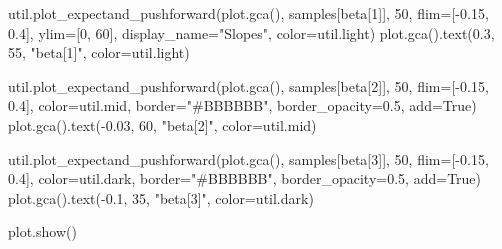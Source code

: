 \documentclass[
  letterpaper,
  DIV=11,
  numbers=noendperiod]{scrartcl}
\newenvironment{Shaded}{\begin{snugshade}}{\end{snugshade}}
\newcommand{\DecValTok}[1]{\textcolor[rgb]{0.68,0.00,0.00}{#1}}
\newcommand{\FloatTok}[1]{\textcolor[rgb]{0.68,0.00,0.00}{#1}}
\newcommand{\NormalTok}[1]{\textcolor[rgb]{0.00,0.23,0.31}{#1}}
\newcommand{\OperatorTok}[1]{\textcolor[rgb]{0.37,0.37,0.37}{#1}}
\newcommand{\StringTok}[1]{\textcolor[rgb]{0.13,0.47,0.30}{#1}}
\newcommand{\VariableTok}[1]{\textcolor[rgb]{0.07,0.07,0.07}{#1}}
\begin{document}
\begin{Shaded}
\begin{Highlighting}[]
\NormalTok{util.plot\_expectand\_pushforward(plot.gca(), samples[}\StringTok{\textquotesingle{}beta[1]\textquotesingle{}}\NormalTok{],}
                                \DecValTok{50}\NormalTok{, flim}\OperatorTok{=}\NormalTok{[}\OperatorTok{{-}}\FloatTok{0.15}\NormalTok{, }\FloatTok{0.4}\NormalTok{],}
\NormalTok{                                ylim}\OperatorTok{=}\NormalTok{[}\DecValTok{0}\NormalTok{, }\DecValTok{60}\NormalTok{],}
\NormalTok{                                display\_name}\OperatorTok{=}\StringTok{"Slopes"}\NormalTok{,}
\NormalTok{                                color}\OperatorTok{=}\NormalTok{util.light)}
\NormalTok{plot.gca().text(}\FloatTok{0.3}\NormalTok{, }\DecValTok{55}\NormalTok{, }\StringTok{"beta[1]"}\NormalTok{, color}\OperatorTok{=}\NormalTok{util.light)}

\NormalTok{util.plot\_expectand\_pushforward(plot.gca(), samples[}\StringTok{\textquotesingle{}beta[2]\textquotesingle{}}\NormalTok{],}
                                \DecValTok{50}\NormalTok{, flim}\OperatorTok{=}\NormalTok{[}\OperatorTok{{-}}\FloatTok{0.15}\NormalTok{, }\FloatTok{0.4}\NormalTok{],}
\NormalTok{                                color}\OperatorTok{=}\NormalTok{util.mid,}
\NormalTok{                                border}\OperatorTok{=}\StringTok{"\#BBBBBB"}\NormalTok{,}
\NormalTok{                                border\_opacity}\OperatorTok{=}\FloatTok{0.5}\NormalTok{,}
\NormalTok{                                add}\OperatorTok{=}\VariableTok{True}\NormalTok{)}
\NormalTok{plot.gca().text(}\OperatorTok{{-}}\FloatTok{0.03}\NormalTok{, }\DecValTok{60}\NormalTok{, }\StringTok{"beta[2]"}\NormalTok{, color}\OperatorTok{=}\NormalTok{util.mid)}

\NormalTok{util.plot\_expectand\_pushforward(plot.gca(), samples[}\StringTok{\textquotesingle{}beta[3]\textquotesingle{}}\NormalTok{],}
                                \DecValTok{50}\NormalTok{, flim}\OperatorTok{=}\NormalTok{[}\OperatorTok{{-}}\FloatTok{0.15}\NormalTok{, }\FloatTok{0.4}\NormalTok{],}
\NormalTok{                                color}\OperatorTok{=}\NormalTok{util.dark,}
\NormalTok{                                border}\OperatorTok{=}\StringTok{"\#BBBBBB"}\NormalTok{,}
\NormalTok{                                border\_opacity}\OperatorTok{=}\FloatTok{0.5}\NormalTok{,}
\NormalTok{                                add}\OperatorTok{=}\VariableTok{True}\NormalTok{)}
\NormalTok{plot.gca().text(}\OperatorTok{{-}}\FloatTok{0.1}\NormalTok{, }\DecValTok{35}\NormalTok{, }\StringTok{"beta[3]"}\NormalTok{, color}\OperatorTok{=}\NormalTok{util.dark)}

\NormalTok{plot.show()}
\end{Highlighting}
\end{Shaded}
\end{document}
